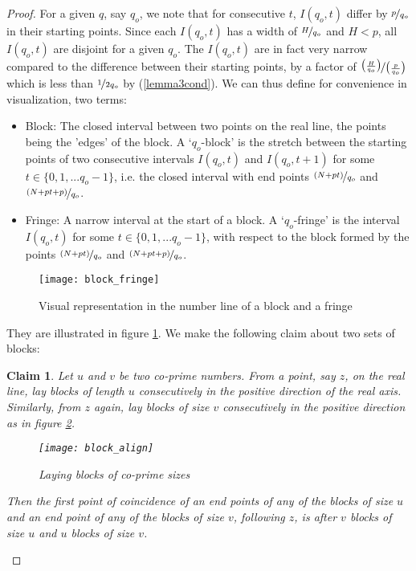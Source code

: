 \documentclass{report}
\newtheorem*{claim*}{Claim}
\begin{document}
\begin{proof}
For a given $q$, say $q_o$, we note that for consecutive $t$, $I(q_o,t)$ differ by $\nicefrac{p}{q_o}$ in their starting points. Since each $I(q_o,t)$ has a width of $\nicefrac{H}{q_o}$ and $H<p$, all $I(q_o,t)$ are disjoint for a given $q_o$. The $I(q_o,t)$ are in fact very narrow compared to the difference between their starting points, by a factor of $\nicefrac{\big(\frac{H}{q_o}\big)}{\big(\frac{p}{q_o}}\big)$ which is less than $\nicefrac{1}{2q_o}$ by (\ref{lemma3cond}). We can thus define for convenience in visualization, two terms:
\begin{itemize}
    \item Block: The closed interval between two points on the real line, the points being the 'edges' of the block. A `$q_o$-block' is the stretch between the starting points of two consecutive intervals $I(q_o,t)$ and $I(q_o,t+1)$ for some $t\in\{0,1,...q_o-1\}$, i.e. the closed interval with end points $\nicefrac{(N+pt)}{q_o}$ and $\nicefrac{(N+pt+p)}{q_o}$.
    \item Fringe: A narrow interval at the start of a block. A `$q_o$-fringe' is the interval $I(q_o,t)$ for some $t\in\{0,1,...q_o-1\}$, with respect to the block formed by the points $\nicefrac{(N+pt)}{q_o}$ and $\nicefrac{(N+pt+p)}{q_o}$.
\end{itemize}
\begin{figure}
\texttt{[image: block\_fringe]}
\centering
\caption{Visual representation in the number line of a block and a fringe}
\label{fig:block_fringe}
\end{figure}
They are illustrated in figure \ref{fig:block_fringe}. We make the following claim about two sets of blocks:
%
\begin{claim*}
  Let $u$ and $v$ be two co-prime numbers. From a point, say $z$, on the real line, lay blocks of length $u$ consecutively in the positive direction of the real axis. Similarly, from $z$ again, lay blocks of size $v$ consecutively in the positive direction as in figure \ref{fig:block_align}.
  \begin{figure}
  \texttt{[image: block\_align]}
  \centering
  \caption{Laying blocks of co-prime sizes}
  \label{fig:block_align}
  \end{figure}
  Then the first point of coincidence of an end points of any of the blocks of size $u$ and an end point of any of the blocks of size $v$, following $z$, is after $v$ blocks of size $u$ and $u$ blocks of size $v$.
\end{claim*}

\end{proof}
\end{document}
